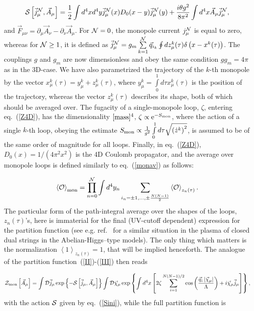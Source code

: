 \documentclass[a4paper,12pt]{article}
\begin{document}
\begin{equation}
\label{Sini}
{\cal S}\left[\vec j_\mu^{\cal N}, \vec A_\mu\right]=
\frac{1}{2}\int d^4xd^4y\vec j_\mu^{\cal N}(x)
D_0(x-y)\vec j_\mu^{\cal N}(y)+
\frac{i\theta g^2}{8\pi^2}
\int d^4x\vec A_\mu\vec j_\mu^{\cal N},
\end{equation}
and $\vec F_{\mu\nu}=\partial_\mu\vec A_\nu-\partial_\nu\vec A_\mu$.
For ${\cal N}=0$, the monopole current $j_\mu^{\cal N}$ is equal to zero, whereas for
${\cal N}\ge 1$, it is defined as
$\vec j_\mu^{\cal N}=
g_m\sum\limits_{k=1}^{\cal N}\vec q_{i_k}
\oint dz_\mu^k(\tau)\delta\left(x-x^k(\tau)\right)$. The couplings $g$ and $g_m$ are now dimensionless and obey the same condition $gg_m=4\pi$
as in the 3D-case. We have also parametrized the trajectory of the
$k$-th monopole by the vector $x_\mu^k(\tau)=y_\mu^k+z_\mu^k(\tau)$,
where $y_\mu^k=\int\limits_{0}^{1}d\tau x_\mu^k(\tau)$ is the
position of the trajectory, whereas the vector $z_\mu^k(\tau)$
describes its shape, both of which should be averaged over.
The fugacity of a single-monopole loop, $\zeta$, entering eq.~(\ref{Z4D}), has the dimensionality $[{\rm mass}]^4$,
$\zeta\propto {\rm e}^{-S_{\rm mon}}$, where
the action of a single $k$-th loop, obeying the
estimate $S_{\rm mon}\propto\frac{1}{g^2}\int\limits_{0}^{1}d\tau
\sqrt{\left(\dot z^k\right)^2}$, is assumed to be of the same order of magnitude
for all loops. Finally, in eq.~(\ref{Z4D}), $D_0(x)=1/(4\pi^2x^2)$ is the 4D Coulomb propagator, and the average over monopole loops
is defined similarly to eq.~(\ref{monav}) as follows:

$$\left<{\cal O}\right>_{\rm mon}=
\prod\limits_{n=0}^{\cal N}\int d^4y_n
\sum\limits_{i_n=\pm 1,\ldots,\pm\frac{N(N-1)}{2}}^{}\left<{\cal O}\right>_{z_n(\tau)}.$$
The particular form of the path-integral average over the shapes of the loops, $z_n(\tau)$'s, here is immaterial for the final (UV-cutoff dependent)
expression for the partition function (see e.g. ref.~\cite{jh} for a similar situation in the plasma of closed dual strings in the Abelian-Higgs--type
models). The only thing which matters is the normalization $\left<1\right>_{z_n(\tau)}=1$, that will be implied
henceforth. The analogue of the partition function~(\ref{II})-(\ref{III}) then reads


\begin{equation}
\label{interm}
{\cal Z}_{\rm mon}\left[\vec A_\mu\right]=\int {\cal D}\vec j_\mu\exp\left\{-{\cal S}
\left[\vec j_\mu, \vec A_\mu\right]\right\}\int{\cal D}\vec\chi_\mu
\exp\left\{\int d^4x\left[2\zeta\sum\limits_{i=1}^{N(N-1)/2}
\cos\left(\frac{\vec q_i\left|\vec\chi_\mu\right|}{\Lambda}\right)+i\vec\chi_\mu\vec j_\mu\right]\right\},
\end{equation}
with the action ${\cal S}$ given by eq.~(\ref{Sini}),
while the full partition function is
\end{document}
